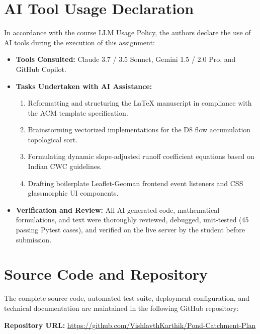 \documentclass[manuscript,screen,review]{acmart}
\begin{document}
\section{AI Tool Usage Declaration}
\label{sec:ai-usage}
In accordance with the course LLM Usage Policy, the authors declare the use of AI tools during the execution of this assignment:
\begin{itemize}
    \item \textbf{Tools Consulted:} Claude 3.7 / 3.5 Sonnet, Gemini 1.5 / 2.0 Pro, and GitHub Copilot.
    \item \textbf{Tasks Undertaken with AI Assistance:}
    \begin{enumerate}
        \item Reformatting and structuring the LaTeX manuscript in compliance with the ACM template specification.
        \item Brainstorming vectorized implementations for the D8 flow accumulation topological sort.
        \item Formulating dynamic slope-adjusted runoff coefficient equations based on Indian CWC guidelines.
        \item Drafting boilerplate Leaflet-Geoman frontend event listeners and CSS glassmorphic UI components.
    \end{enumerate}
    \item \textbf{Verification and Review:} All AI-generated code, mathematical formulations, and text were thoroughly reviewed, debugged, unit-tested (45 passing Pytest cases), and verified on the live server by the student before submission.
\end{itemize}

\appendix

\section{Source Code and Repository}
The complete source code, automated test suite, deployment configuration, and technical documentation are maintained in the following GitHub repository:
\begin{center}
\textbf{Repository URL:} \url{https://github.com/VishlavthKarthik/Pond-Catchment-Plan}
\end{center}
\end{document}
